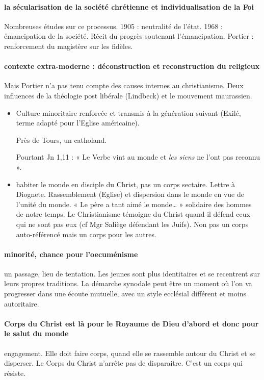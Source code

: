 \paragraph{la sécularisation de la société chrétienne et individualisation de la Foi} Nombreuses études sur ce processus. 1905 : neutralité de l’état. 1968 : émancipation de la société. Récit du progrès soutenant l’émancipation. Portier : renforcement du magistère sur les fidèles.

\paragraph{contexte extra-moderne : déconstruction et reconstruction du religieux}  Mais Portier n’a pas tenu compte des causes internes au christianisme. Deux influences de la théologie post libérale (Lindbeck) et le mouvement maurassien. 
\begin{itemize}
\item 
Culture minoritaire renforcée et transmis à la génération suivant (Exilé, terme adapté pour l’Eglise américaine). 
\begin{Ex}
Près de Tours, un catholand.
\end{Ex}
Pourtant Jn 1,11 : « Le Verbe vint au monde et \textit{les siens} ne l’ont pas reconnu ». 
\item habiter le monde en disciple du Christ, pas un corps sectaire. Lettre à Diognete. Rassemblement (Eglise) et dispersion dans le monde en vue de l’unité du monde. 
« Le père a tant aimé le monde… » solidaire des hommes de notre temps.  Le Christianisme témoigne du Christ quand il défend ceux qui ne sont pas eux (cf Mgr Saliège défendant les Juifs).  Non pas un corps auto-référencé mais un corps pour les autres. 
\end{itemize}

\paragraph{minorité, chance pour l’oecuménisme} un passage, lieu de tentation. Les jeunes sont plus identitaires et se recentrent sur leurs propres traditions. La démarche synodale peut être un moment où l’on va progresser dans une écoute mutuelle, avec un style ecclésial différent et moins autoritaire. 

\paragraph{Corps du Christ est là pour le Royaume de Dieu d’abord et donc pour le salut du monde} engagement. Elle doit faire corps, quand elle se rassemble autour du Christ et se disperser. Le Corps du Christ n’arrête pas de disparaitre.  C’est un corps qui résiste. 
